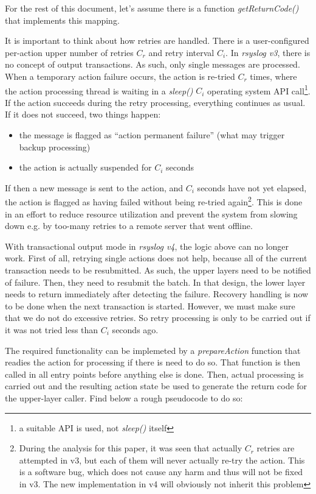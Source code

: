 \documentclass[a4paper,10pt]{article}
\begin{document}
For the rest of this document, let's assume there is a function \emph{getReturnCode()} that implements this mapping.

It is important to think about how retries are handled. There is a user-configured per-action upper number of retries $C_r$ and retry interval $C_i$. In \emph{rsyslog v3}, there is no concept of output transactions. As such, only single messages are processed. When a temporary action failure occurs, the action is re-tried $C_r$ times, where the action processing thread is waiting in a \emph{sleep()} $C_i$ operating system API call\footnote{a suitable API is used, not \emph{sleep()} itself}. If the action succeeds during the retry processing, everything continues as usual. If it does not succeed, two things happen:
\begin{itemize}
\item the message is flagged as ``action permanent failure'' (what may trigger backup processing)
\item the action is actually suspended for $C_i$ seconds
\end{itemize}
If then a new message is sent to the action, and $C_i$ seconds have not yet elapsed, the action is flagged as having failed without being re-tried again\footnote{During the analysis for this paper, it was seen that actually $C_r$ retries are attempted in v3, but each of them will never actually re-try the action. This is a software bug, which does not cause any harm and thus will not be fixed in v3. The new implementation in v4 will obviously not inherit this problem}. This is done in an effort to reduce resource utilization and prevent the system from slowing down e.g. by too-many retries to a remote server that went offline.

With transactional output mode in \emph{rsyslog v4}, the logic above can no longer work. First of all, retrying single actions does not help, because all of the current transaction needs to be resubmitted. As such, the upper layers need to be notified of failure. Then, they need to resubmit the batch. In that design, the lower layer needs to return immediately after detecting the failure. Recovery handling is now to be done when the next transaction is started. However, we must make sure that we do not do excessive retries. So retry processing is only to be carried out if it was not tried less than $C_i$ seconds ago.

The required functionality can be implemeted by a \emph{prepareAction} function that readies the action for processing if there is need to do so. That function is then called in all entry points before anything else is done. Then, actual processing is carried out and the resulting action state be used to generate the return code for the upper-layer caller. Find below a rough pseudocode to do so:
\end{document}
